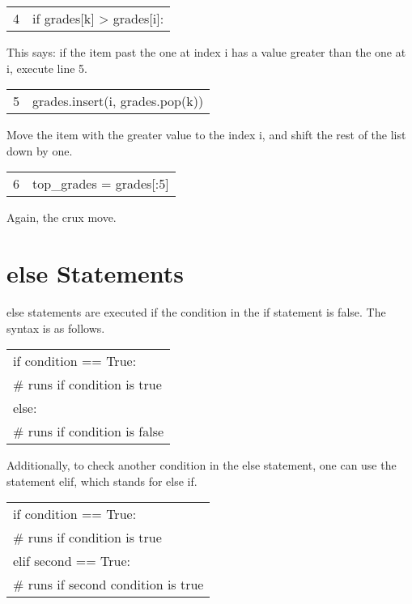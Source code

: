 \documentclass{article}
\newcommand{\icode}[1]{{\ttfamily #1}}
\newenvironment{code}{\begin{tcolorbox}\ttfamily}{\end{tcolorbox}}
\begin{document}
\begin{code}
	\begin{tabular}{l|l}
		4&\hspace{4 em}if grades[k] > grades[i]:
	\end{tabular}
\end{code}
This says: if the item past the one at index \icode{i} has a value greater than the one at \icode{i}, execute line 5.

\begin{code}
	\begin{tabular}{l|l}
		5& \hspace{6 em}grades.insert(i, grades.pop(k))
	\end{tabular}
\end{code}
Move the item with the greater value to the index \icode{i}, and shift the rest of the list down by one.

\begin{code}
	\begin{tabular}{l|l}
		6& top\_grades = grades[:5]
	\end{tabular}
\end{code}
Again, the crux move.


\section{\icode{else} Statements}
\icode{else} statements are executed if the condition in the \icode{if} statement is false. The syntax is as follows.

\begin{center} \ttfamily
	\begin{tabular}{|l}
		if condition == True:\\
		\hspace{2 em}\# runs if condition is true\\
		else:\\
		\hspace{2 em}\# runs if condition is false
	\end{tabular}
\end{center}
Additionally, to check another condition in the else statement, one can use the statement \icode{elif}, which stands for else if.

\begin{center} \ttfamily
	\begin{tabular}{|l}
		if condition == True:\\
		\hspace{2 em}\# runs if condition is true\\
		elif second == True:\\
		\hspace{2 em}\# runs if second condition is true
	\end{tabular}
\end{center}
\end{document}
